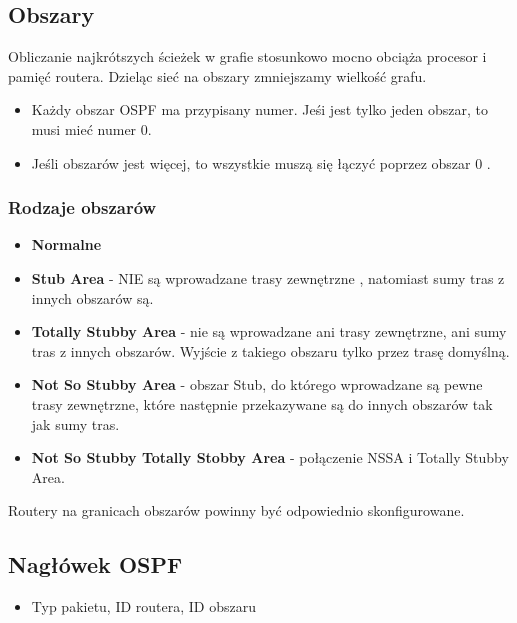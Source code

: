 \documentclass[../sk-egzamin.tex]{subfiles}
\begin{document}
\subsection*{Obszary}
Obliczanie najkrótszych ścieżek w grafie stosunkowo mocno obciąża procesor i
pamięć routera. Dzieląc sieć na obszary zmniejszamy wielkość grafu.

\begin{itemize}
    \item Każdy obszar OSPF ma przypisany numer. Jeśi jest tylko jeden obszar,
    to musi mieć numer 0.
    \item Jeśli obszarów jest więcej, to wszystkie muszą się łączyć poprzez
    obszar 0 .
\end{itemize}

\subsubsection*{Rodzaje obszarów}
\begin{itemize}
    \item \textbf{Normalne}
    \item \textbf{Stub Area} - NIE są wprowadzane trasy
    zewnętrzne ,
    natomiast sumy tras z innych obszarów są.
    \item \textbf{Totally Stubby Area} - nie są wprowadzane ani trasy
    zewnętrzne, ani sumy tras z innych obszarów.
    Wyjście z takiego obszaru tylko przez trasę domyślną.
    \item \textbf{Not So Stubby Area}  - obszar Stub, do którego
    wprowadzane są pewne  trasy zewnętrzne, które
    następnie przekazywane są do innych obszarów tak jak sumy tras.
    \item \textbf{Not So Stubby Totally Stobby Area} - połączenie NSSA i
    Totally Stubby Area.
\end{itemize}
Routery na granicach obszarów powinny być odpowiednio skonfigurowane.

\subsection*{Nagłówek OSPF}
\begin{itemize}
    \item Typ pakietu, ID routera, ID obszaru
\end{itemize}
\end{document}
